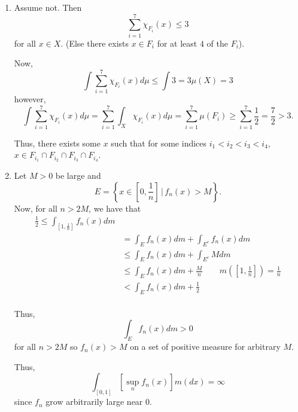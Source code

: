 \documentclass[12pt]{Homework}
\begin{document}
\begin{solution}$\,$
\begin{enumerate}[label=(\alph*)]
    \item Assume not. Then $$\sum_{i=1}^7\chi_{F_i}(x)\le3$$ for all $x\in X$. (Else there exists $x\in F_i$ for at least $4$ of the $F_i$).
    
    Now, $$\int\sum_{i=1}^7\chi_{F_i}(x)d\mu\le\int 3=3\mu(X)=3$$ however, $$\int\sum_{i=1}^7\chi_{F_i}(x)d\mu=\sum_{i=1}^7\int_X\chi_{F_i}(x)d\mu=\sum_{i=1}^7\mu(F_i)\ge\sum_{i=1}^7\frac{1}{2}=\frac{7}{2}>3.$$
    
    Thus, there exists some $x$ such that for some indices $i_1<i_2<i_3<i_4$, $x\in F_{i_1}\cap F_{i_2}\cap F_{i_3}\cap F_{i_4}$.
    \item Let $M>0$ be large and $$E=\left\{x\in\left[0,\frac{1}{n}\right]\,|\,f_n(x)>M\right\}.$$ Now, for all $n>2M$, we have that \begin{align*}
        \frac{1}{2}\le\int_{[1,\frac{1}{n}]}f_n(x)dm\\
        &=\int_Ef_n(x)dm+\int_{E^c}f_n(x)dm\\
        &\le\int_E f_n(x)dm+\int_{E^c}Mdm\\
        &\le \int_E f_n(x)dm+\frac{M}{n}\qquad m\left(\left[1,\frac{1}{n}\right]\right)=\frac{1}{n}\\
        &<\int_E f_n(x)dm+\frac{1}{2}\\
    \end{align*}
    
    Thus, $$\int_E f_n(x)dm>0$$ for all $n>2M$ so $f_n(x)>M$ on a set of positive measure for arbitrary $M$. 
    
    Thus, $$\int_{[0,1]}[\sup_nf_n(x)]m(dx)=\infty$$ since $f_n$ grow arbitrarily large near $0$.
\end{enumerate}
\end{solution}
\vspace{0.5cm}
\end{document}
